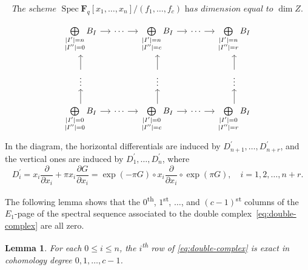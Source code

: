 \documentclass[10pt,a4paper]{amsart}
\numberwithin{equation}{section}
\renewcommand{\mathbb}{\mathbf}
\theoremstyle{plain}
\newtheorem{lemma}[equation]{Lemma}
\theoremstyle{definition}
\theoremstyle{plain}
\begin{document}
\setcounter{section}{6}\setcounter{equation}{3}
\begin{equation}\label{eq:hypothesis}
  \textit{The scheme \(\operatorname{Spec}\mathbb{F}_q[x_1,\ldots,x_n]/(f_1,\ldots,f_c)\) has dimension equal to \(\dim Z\).}
\end{equation}

\begin{equation}\label{eq:double-complex}
  \begin{tikzcd}[column sep=small]
    \bigoplus\limits_{\substack{|I^{\prime}|=n \\|I^{\prime\prime}|=0}}B_I \ar[r] & \cdots \ar[r] & \bigoplus\limits_{\substack{|I^{\prime}|=n \\|I^{\prime\prime}|=c}}B_I  \ar[r] & \cdots \ar[r] & \bigoplus\limits_{\substack{|I^{\prime}|=n \\|I^{\prime\prime}|=r}}B_I \\
    {\vdots} \ar[u] & {} & {\vdots} \ar[u]  & {} & {\vdots} \ar[u] \\
    \bigoplus\limits_{\substack{|I^{\prime}|=0 \\|I^{\prime\prime}|=0}}B_I \ar[r] \ar[u]& \cdots \ar[r] & \bigoplus\limits_{\substack{|I^{\prime}|=0 \\|I^{\prime\prime}|=c}}B_I \ar[u]  \ar[r] & \cdots \ar[r] & \bigoplus\limits_{\substack{|I^{\prime}|=0 \\|I^{\prime\prime}|=r}}B_I \ar[u]
  \end{tikzcd}
\end{equation}
In the diagram, the horizontal differentials are induced by
\(D^{\prime}_{n+1},\ldots,D^{\prime}_{n+r}\),
and the vertical ones are induced by \(D^{\prime}_1,\ldots,D^{\prime}_{n}\),
where
\begin{equation}
D^{\prime}_{i} = x_{i}\frac{\partial}{\partial x_i} + \pi x_{i}\frac{\partial G}{\partial x_{i}}
=\exp(-\pi G) \circ x_{i}\frac{\partial}{\partial x_i}\circ \exp(\pi G), \quad i=1,2,\ldots,n+r.
\end{equation}


The following lemma shows that the \(0\)\textsuperscript{th},
\(1\)\textsuperscript{st}, \(\ldots\), and \((c-1)\)\textsuperscript{st} columns
of the \(E_1\)-page of the spectral sequence associated to the double
complex~\eqref{eq:double-complex} are all zero.

\begin{lemma}
  \label{lemma:c-exactness-of-rows}
  For each \(0\leq i\leq n\), the \(i\)\textsuperscript{th} row of
  \eqref{eq:double-complex} is exact in cohomology degree \(0,1,\ldots,c-1\).
\end{lemma}
\end{document}
